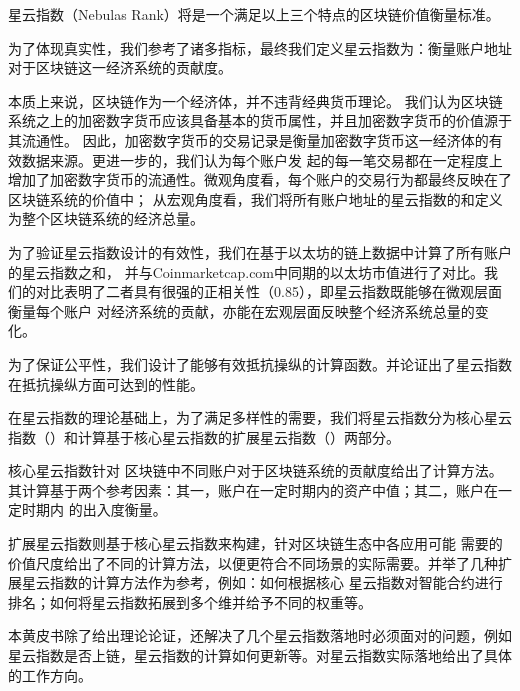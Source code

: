 星云指数（Nebulas Rank）将是一个满足以上三个特点的区块链价值衡量标准。

为了体现真实性，我们参考了诸多指标，最终我们定义星云指数为：衡量账户地址对于区块链这一经济系统的贡献度。

本质上来说，区块链作为一个经济体，并不违背经典货币理论。
我们认为区块链系统之上的加密数字货币应该具备基本的货币属性，并且加密数字货币的价值源于其流通性。
因此，加密数字货币的交易记录是衡量加密数字货币这一经济体的有效数据来源。更进一步的，我们认为每个账户发
起的每一笔交易都在一定程度上增加了加密数字货币的流通性。微观角度看，每个账户的交易行为都最终反映在了区块链系统的价值中；
从宏观角度看，我们将所有账户地址的星云指数的和定义为整个区块链系统的经济总量。

为了验证星云指数设计的有效性，我们在基于以太坊的链上数据中计算了所有账户的星云指数之和，
并与Coinmarketcap.com中同期的以太坊市值进行了对比。我们的对比表明了二者具有很强的正相关性（0.85），即星云指数既能够在微观层面衡量每个账户
对经济系统的贡献，亦能在宏观层面反映整个经济系统总量的变化。

为了保证公平性，我们设计了能够有效抵抗操纵的计算函数。并论证出了星云指数在抵抗操纵方面可达到的性能。

在星云指数的理论基础上，为了满足多样性的需要，我们将星云指数分为核心星云指数（\nrcore）和计算基于核心星云指数的扩展星云指数（\nrext）两部分。

核心星云指数针对
区块链中不同账户对于区块链系统的贡献度给出了计算方法。其计算基于两个参考因素：其一，账户在一定时期内的资产中值；其二，账户在一定时期内
的出入度衡量。

扩展星云指数则基于核心星云指数来构建，针对区块链生态中各应用可能
需要的价值尺度给出了不同的计算方法，以便更符合不同场景的实际需要。并举了几种扩展星云指数的计算方法作为参考，例如：如何根据核心
星云指数对智能合约进行排名；如何将星云指数拓展到多个维并给予不同的权重等。

本黄皮书除了给出理论论证，还解决了几个星云指数落地时必须面对的问题，例如星云指数是否上链，星云指数的计算如何更新等。对星云指数实际落地给出了具体的工作方向。




